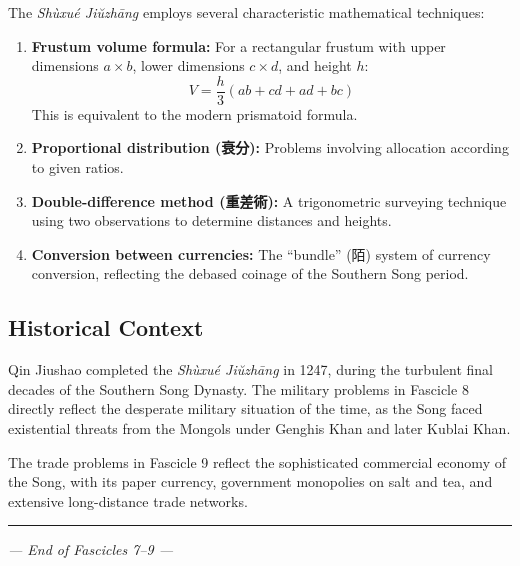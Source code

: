 \documentclass[11pt,a4paper]{article}
\newcommand{\longline}{\noindent\rule{\textwidth}{0.4pt}}
\begin{document}
The \textit{Sh\`uxu\'e Ji\u{u}zh\=ang} employs several characteristic mathematical techniques:

\begin{enumerate}
  \item \textbf{Frustum volume formula:} For a rectangular frustum with upper dimensions $a \times b$, lower dimensions $c \times d$, and height $h$:
  \[
  V = \frac{h}{3}(ab + cd + ad + bc)
  \]
  This is equivalent to the modern prismatoid formula.

  \item \textbf{Proportional distribution (衰分):} Problems involving allocation according to given ratios.

  \item \textbf{Double-difference method (重差術):} A trigonometric surveying technique using two observations to determine distances and heights.

  \item \textbf{Conversion between currencies:} The ``bundle'' (陌) system of currency conversion, reflecting the debased coinage of the Southern Song period.
\end{enumerate}

\subsection*{Historical Context}

Qin Jiushao completed the \textit{Sh\`uxu\'e Ji\u{u}zh\=ang} in 1247, during the turbulent final decades of the Southern Song Dynasty. The military problems in Fascicle 8 directly reflect the desperate military situation of the time, as the Song faced existential threats from the Mongols under Genghis Khan and later Kublai Khan.

The trade problems in Fascicle 9 reflect the sophisticated commercial economy of the Song, with its paper currency, government monopolies on salt and tea, and extensive long-distance trade networks.

\vspace{2em}
\begin{center}
\longline
\vspace{1em}
{\small\color{sectioncolor}
\textit{--- End of Fascicles 7--9 ---}
}
\end{center}
\end{document}
